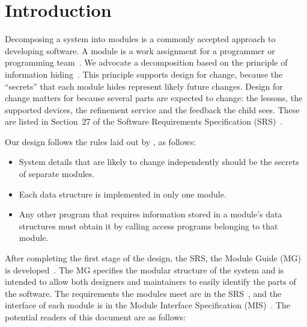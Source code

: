 \documentclass[12pt, titlepage]{article}
\begin{document}
\newpage

\tableofcontents

\listoftables

\listoffigures

\newpage


\section{Introduction}

Decomposing a system into modules is a commonly accepted approach to developing
software.  A module is a work assignment for a programmer or programming
team~\citep{ParnasEtAl1984}.  We advocate a decomposition
based on the principle of information hiding~\citep{Parnas1972a}.  This
principle supports design for change, because the ``secrets'' that each module
hides represent likely future changes.  Design for change matters for
\progname{} because several parts are expected to change: the lessons, the
supported devices, the refinement service and the feedback the child sees.
These are listed in Section~27 of the Software Requirements Specification
(SRS)~\citep{SRS}.

Our design follows the rules laid out by \citet{ParnasEtAl1984}, as follows:
\begin{itemize}
\item System details that are likely to change independently should be the
  secrets of separate modules.
\item Each data structure is implemented in only one module.
\item Any other program that requires information stored in a module's data
  structures must obtain it by calling access programs belonging to that module.
\end{itemize}

After completing the first stage of the design, the SRS, the Module Guide (MG)
is
developed~\citep{ParnasEtAl1984}. The MG
specifies the modular structure of the system and is intended to allow both
designers and maintainers to easily identify the parts of the software. The
requirements the modules meet are in the SRS~\citep{SRS}, and the interface of
each module is in the Module Interface Specification (MIS)~\citep{MIS}. The
potential readers of this document are as follows:
\end{document}
